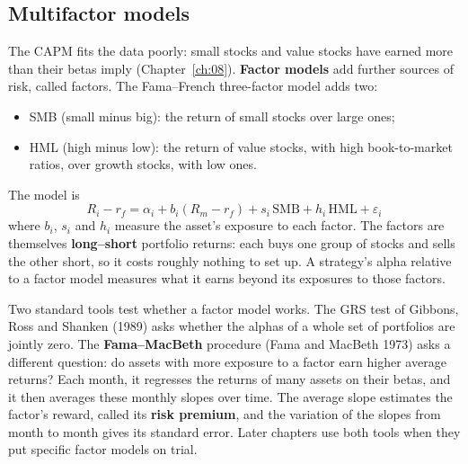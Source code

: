 
\subsection{Multifactor models}
\label{sec:03-factors}

The CAPM fits the data poorly: small stocks and value stocks have earned more than their betas imply (Chapter~\ref{ch:08}). \textbf{Factor models} add further sources of risk, called factors. The Fama--French three-factor model adds two:

\begin{itemize}
  \item SMB (small minus big): the return of small stocks over large ones;
  \item HML (high minus low): the return of value stocks, with high book-to-market ratios, over growth stocks, with low ones.
\end{itemize}

The model is
\begin{equation}
  R_i - r_f = \alpha_i + b_i(R_m - r_f) + s_i\,\mathrm{SMB} + h_i\,\mathrm{HML} + \varepsilon_i
  \label{eq:03-ff3}
\end{equation}
where $b_i$, $s_i$ and $h_i$ measure the asset's exposure to each factor. The factors are themselves \textbf{long--short} portfolio returns: each buys one group of stocks and sells the other short, so it costs roughly nothing to set up. A strategy's alpha relative to a factor model measures what it earns beyond its exposures to those factors.

Two standard tools test whether a factor model works. The GRS test of Gibbons, Ross and Shanken (1989) asks whether the alphas of a whole set of portfolios are jointly zero. The \textbf{Fama--MacBeth} procedure (Fama and MacBeth 1973) asks a different question: do assets with more exposure to a factor earn higher average returns? Each month, it regresses the returns of many assets on their betas, and it then averages these monthly slopes over time. The average slope estimates the factor's reward, called its \textbf{risk premium}, and the variation of the slopes from month to month gives its standard error. Later chapters use both tools when they put specific factor models on trial.

